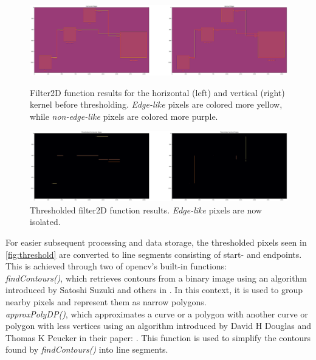 \begin{figure}[htb]
    \centering
    \includegraphics[width=1\linewidth]{pictures/filter2D.png}
    \caption[Filter2D function results for the horizontal and vertical kernel]{Filter2D function results for the horizontal (left) and vertical (right) kernel before thresholding. \textit{Edge-like} pixels are colored more yellow, while \textit{non-edge-like} pixels are colored more purple.}
    \label{fig:filter2d}

    \centering
    \includegraphics[width=1\linewidth]{pictures/threshold.png}
    \caption[Filter2D function results for the horizontal and vertical kernel thresholded]{Thresholded filter2D function results. \textit{Edge-like} pixels are now isolated.}
    \label{fig:threshold}
\end{figure}
For easier subsequent processing and data storage, the thresholded pixels seen in \autoref{fig:threshold} are converted to line segments consisting of start- and endpoints. This is achieved through two of \acrshort{opencv}'s built-in functions:\\
\textit{findContours()}, which retrieves contours from a binary image using an algorithm introduced by Satoshi Suzuki and others in \cite{suzuki_1985}. In this context, it is used to group nearby pixels and represent them as narrow polygons.\\
\textit{approxPolyDP()}, which approximates a curve or a polygon with another curve or polygon with less vertices using an algorithm introduced by David H Douglas and Thomas K Peucker in their paper: \cite{douglas_peucker_1973}. This function is used to simplify the contours found by \textit{findContours()} into line segments.
